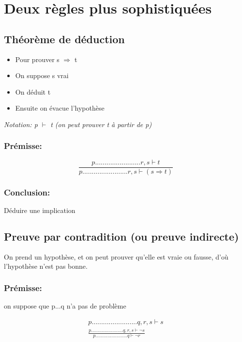 
\section{Deux règles plus sophistiquées}

\subsection{Théorème de déduction}

\begin{itemize}
\item  Pour prouver s $\Rightarrow$ t
\item  On suppose s vrai
\item  On déduit t
\item  Ensuite on évacue l'hypothèse
\end{itemize}


\it{Notation: p $\vdash$ t (on peut prouver t à partir de p) }

\subsubsection{Prémisse:}

\begin{equation}
\frac{p........................r, s \vdash t} 
{p........................r, s \vdash (s \Rightarrow t)}
\end{equation}

\subsubsection{Conclusion:}

Déduire une implication

\subsection{Preuve par contradition (ou preuve indirecte)}

On prend un hypothèse, et on peut prouver qu'elle est vraie ou fausse, d'où l'hypothèse n'est pas bonne.

\subsubsection{Prémisse:} 
on suppose que p...q n'a pas de problème

\begin{equation}
\begin{split}
p........................q, r, s \vdash s \\
\frac{p........................ q,r, s \vdash \lnot s}
{p........................ q \vdash \lnot r}
\end{split}
\end{equation}

